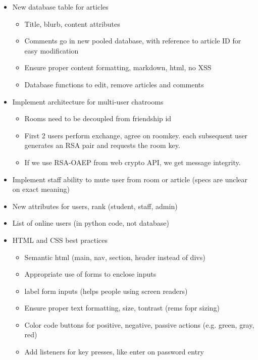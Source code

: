 \documentclass[12pt]{article}
\begin{document}
\begin{itemize}
    \item New database table for articles
    \begin{itemize}
        \item Title, blurb, content attributes
        \item Comments go in new pooled database, with reference to article ID for easy modification
        \item Ensure proper content formatting, markdown, html, no XSS
        \item Database functions to edit, remove articles and comments
    \end{itemize}
    \item Implement architecture for multi-user chatrooms
    \begin{itemize}
        \item Rooms need to be decoupled from friendship id
        \item First 2 users perform exchange, agree on roomkey. each subsequent user generates an RSA pair and requests the room key.
        \item If we use RSA-OAEP from web crypto API, we get message integrity.
    \end{itemize}
    \item Implement staff ability to mute user from room or article (specs are unclear on exact meaning)
    \item New attributes for users, rank (student, staff, admin)
    \item List of online users (in python code, not database)
    \item HTML and CSS best practices
    \begin{itemize}
        \item Semantic html (main, nav, section, header instead of divs)
        \item Appropriate use of forms to enclose inputs
        \item label form inputs (helps people using screen readers)
        \item Ensure proper text formatting, size, tontrast (rems fopr sizing)
        \item Color code buttons for positive, negative, passive actions (e.g. green, gray, red)
        \item Add listeners for key presses, like enter on password entry
    \end{itemize}
\end{itemize}
\end{document}
